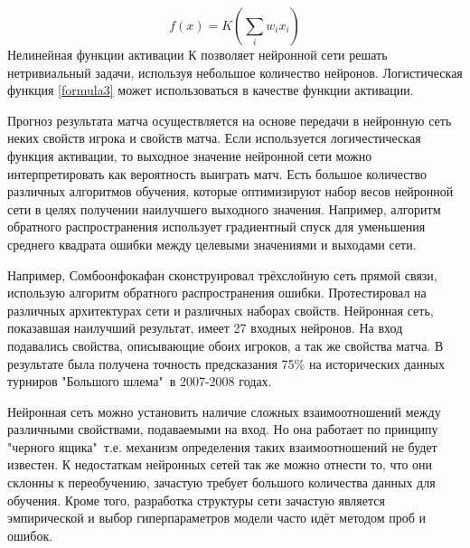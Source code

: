 \begin{equation}
f(x)=K(\sum_iw_ix_i)
\end{equation}
Нелинейная функции активации К позволяет нейронной сети решать нетривиальный задачи, используя небольшое количество нейронов. Логистическая функция \ref{formula3} может использоваться в качестве функции активации.

Прогноз результата матча осуществляется на основе передачи в нейронную сеть неких свойств игрока и свойств матча. Если используется логичестическая функция активации, то выходное значение нейронной сети можно интерпретировать как вероятность выиграть матч. Есть большое количество различных алгоритмов обучения, которые оптимизируют набор весов нейронной сети в целях получении наилучшего выходного значения. Например, алгоритм обратного распространения использует градиентный спуск для уменьшения среднего квадрата ошибки между целевыми значениями и выходами сети.

Например, Сомбоонфокафан\cite{Book12} сконструировал трёхслойную сеть прямой связи, использую алгоритм обратного распространения ошибки. Протестировал на различных архитектурах сети и различных наборах свойств. Нейронная сеть, показавшая наилучший результат, имеет 27 входных нейронов. На вход подавались свойства, описывающие обоих игроков, а так же свойства матча. В результате была получена точность предсказания 75\% на исторических данных турниров "Большого шлема"\ в 2007-2008 годах.

Нейронная сеть можно установить наличие сложных взаимоотношений  между различными свойствами, подаваемыми на вход. Но она работает по принципу "черного ящика"\, т.е. механизм определения таких взаимоотношений не будет известен. К недостаткам нейронных сетей так же можно отнести то, что они склонны к переобучению, зачастую требует большого количества данных для обучения. Кроме того, разработка структуры сети зачастую является эмпирической и выбор гиперпараметров модели часто идёт методом проб и ошибок.
